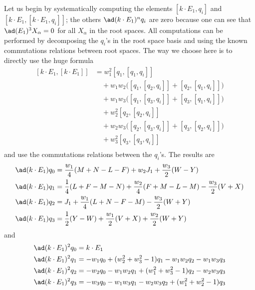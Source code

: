Let us begin by systematically computing the elements $[k\cdot E_1,q_i]$ and $[k\cdot E_1,[k\cdot E_1,q_i]]$; the others $\ad(k\cdot E_1)^nq_i$ are zero because one can see that $\ad(E_1)^3X_{\alpha}=0$ for all $X_{\alpha}$ in the root spaces. All computations can be performed by decomposing the $q_i$'s in the root space basis and using the known commutations relations between root spaces. The way we choose here is to directly use the huge formula
\begin{equation}
\begin{split}
[k\cdot E_1,[k\cdot E_1]]&=w_1^2[q_1,[q_1,q_i]]\\
                         &\quad +w_1w_2\big(  [q_1,[q_2,q_i]]+[q_2,[q_1,q_i]]  \big)\\
                         &\quad +w_1w_3\big(  [q_1,[q_3,q_i]]+[q_3,[q_1,q_i]]  \big)\\
                         &\quad +w_2^2[q_2,[q_2,q_i]]\\
                         &\quad +w_2w_3\big(  [q_2,[q_3,q_i]]+[q_3,[q_2,q_i]]  \big)\\
                         &\quad +w_3^2[q_3,[q_3,q_i]]\\
\end{split}
\end{equation}
and use the commutations relations between the $q_i$'s. The results are
\begin{equation}
\begin{split}
\ad(k\cdot E_1)q_0 &=\frac{w_1}{4}(M+N-L-F)+w_2J_1+\frac{w_3}{2}(W-Y)\\
\ad(k\cdot E_1)q_1 &=\frac{1}{4}(L+F-M-N)+\frac{w_2}{4}(F+M-L-M)-\frac{w_3}{2}(V+X)\\
\ad(k\cdot E_1)q_2 &=J_1+\frac{w_1}{4}(L+N-F-M)-\frac{w_3}{2}(W+Y)\\
\ad(k\cdot E_1)q_3 &=\frac{1}{2}(Y-W)+\frac{w_1}{2}(V+X)+\frac{w_2}{2}(W+Y)\\
\end{split}
\end{equation}
and
\begin{equation}
\begin{split}
\ad(k\cdot E_1)^2q_0 &=k\cdot E_1\\
\ad(k\cdot E_1)^2q_1 &=-w_1q_0+(w_2^2+w_3^2-1)q_1-w_1w_2q_2-w_1w_3q_3\\
\ad(k\cdot E_1)^2q_2 &=-w_2q_0-w_1w_2q_1+(w_1^2+w_3^2-1)q_2-w_2w_3q_3\\
\ad(k\cdot E_1)^2q_3 &=-w_3q_0-w_1w_3q_1-w_2w_3q_2+(w_1^2+w_2^2-1)q_3\\
\end{split}
\end{equation}

